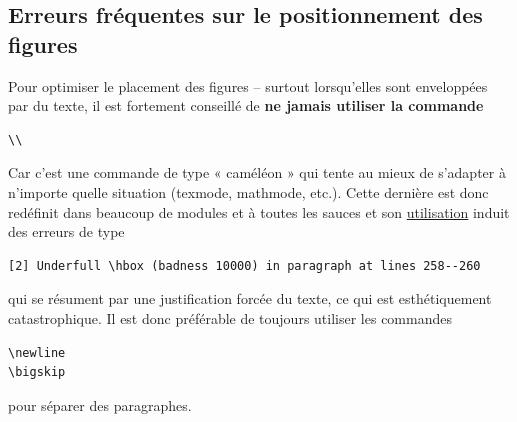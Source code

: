 \documentclass[8pt]{article}
\numberwithin{equation}{section}
\begin{document}
\subsection{Erreurs fréquentes sur le positionnement des figures}
\label{sec:orgef1e367}
Pour optimiser le placement des figures -- surtout lorsqu'elles sont enveloppées par du texte, il est fortement conseillé de \textbf{ne jamais utiliser la commande}
\begin{verbatim}
\\
\end{verbatim}
Car c'est une commande de type « caméléon » qui tente au mieux de s'adapter à n'importe quelle situation (texmode, mathmode, etc.).
Cette dernière est donc redéfinit dans beaucoup de modules et à toutes les sauces et son \href{https://tex.stackexchange.com/questions/82664/when-to-use-par-and-when-newline-or-blank-lines/82666\#82666}{utilisation} induit des erreurs de type
\begin{verbatim}
[2] Underfull \hbox (badness 10000) in paragraph at lines 258--260
\end{verbatim}
qui se résument par une justification forcée du texte, ce qui est esthétiquement catastrophique.
Il est donc préférable de toujours utiliser les commandes
\begin{verbatim}
\newline
\bigskip
\end{verbatim}
pour séparer des paragraphes.
\end{document}
